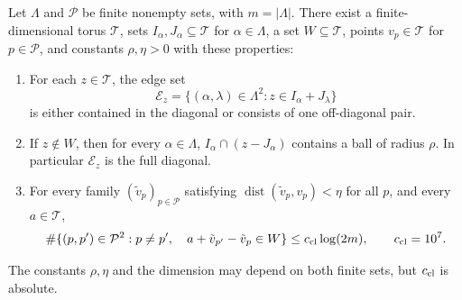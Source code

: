 \begin{lemma}\label{clock:robust}
Let $\Lambda$ and $\mathcal P$ be finite nonempty sets, with
$m=|\Lambda|$. There exist a finite-dimensional torus $\mathcal T$,
sets $I_\alpha,J_\alpha\subseteq\mathcal T$ for $\alpha\in\Lambda$,
a set $W\subseteq\mathcal T$, points $v_p\in\mathcal T$ for
$p\in\mathcal P$, and constants $\rho,\eta>0$ with these properties:
\begin{enumerate}[label=\textup{(\roman*)}]
\item For each $z\in\mathcal T$, the edge set
\begin{equation}\label{clock:edge-set}
 \mathcal E_z=\{(\alpha,\lambda)\in\Lambda^2:
                                  z\in I_\alpha+J_\lambda\}
\end{equation}
is either contained in the diagonal or consists of one off-diagonal pair.
\item If $z\notin W$, then for every $\alpha\in\Lambda$,
$I_\alpha\cap(z-J_\alpha)$ contains a ball of radius $\rho$.
In particular $\mathcal E_z$ is the full diagonal.
\item For every family $(\tilde v_p)_{p\in\mathcal P}$ satisfying
$\operatorname{dist}(\tilde v_p,v_p)<\eta$ for all $p$, and every
$a\in\mathcal T$,
\begin{equation}\label{clock:roster-estimate}
 \#\{(p,p')\in\mathcal P^2:p\ne p',\quad
               a+\tilde v_{p'}-\tilde v_p\in W\}
                         \le c_{\rm cl}\log(2m),
 \qquad c_{\rm cl}=10^7.
\end{equation}
\end{enumerate}
The constants $\rho,\eta$ and the dimension may depend on both finite
sets, but $c_{\rm cl}$ is absolute.
\end{lemma}

